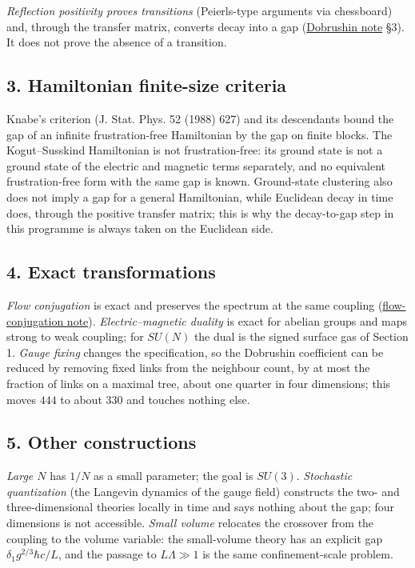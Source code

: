 \documentclass[11pt,a4paper]{article}
\begin{document}
\emph{Reflection positivity proves transitions} (Peierls-type arguments
via chessboard) and, through the transfer matrix, converts decay into a
gap (\href{dobrushin-uniqueness-wilson.md}{Dobrushin note} §3). It does
not prove the absence of a transition.

\hypertarget{hamiltonian-finite-size-criteria}{%
\subsection{3. Hamiltonian finite-size
criteria}\label{hamiltonian-finite-size-criteria}}

Knabe's criterion (J. Stat. Phys. 52 (1988) 627) and its descendants
bound the gap of an infinite frustration-free Hamiltonian by the gap on
finite blocks. The Kogut--Susskind Hamiltonian is not frustration-free:
its ground state is not a ground state of the electric and magnetic
terms separately, and no equivalent frustration-free form with the same
gap is known. Ground-state clustering also does not imply a gap for a
general Hamiltonian, while Euclidean decay in time does, through the
positive transfer matrix; this is why the decay-to-gap step in this
programme is always taken on the Euclidean side.

\hypertarget{exact-transformations}{%
\subsection{4. Exact transformations}\label{exact-transformations}}

\emph{Flow conjugation} is exact and preserves the spectrum at the same
coupling (\href{flow-conjugation-truncation.md}{flow-conjugation note}).
\emph{Electric--magnetic duality} is exact for abelian groups and maps
strong to weak coupling; for \(SU(N)\) the dual is the signed surface
gas of Section 1. \emph{Gauge fixing} changes the specification, so the
Dobrushin coefficient can be reduced by removing fixed links from the
neighbour count, by at most the fraction of links on a maximal tree,
about one quarter in four dimensions; this moves \(444\) to about
\(330\) and touches nothing else.

\hypertarget{other-constructions}{%
\subsection{5. Other constructions}\label{other-constructions}}

\emph{Large \(N\)} has \(1/N\) as a small parameter; the goal is
\(SU(3)\). \emph{Stochastic quantization} (the Langevin dynamics of the
gauge field) constructs the two- and three-dimensional theories locally
in time and says nothing about the gap; four dimensions is not
accessible. \emph{Small volume} relocates the crossover from the
coupling to the volume variable: the small-volume theory has an explicit
gap \(\delta_1g^{2/3}\hbar c/L\), and the passage to \(L\Lambda\gg1\) is
the same confinement-scale problem.
\end{document}
